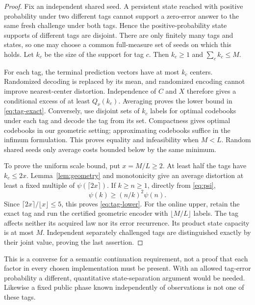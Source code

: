 \begin{proof}
Fix an independent shared seed. A persistent state reached with positive probability under two different tags cannot support a zero-error answer to the same fresh challenge under both tags. Hence the positive-probability state supports of different tags are disjoint. There are only finitely many tags and states, so one may choose a common full-measure set of seeds on which this holds. Let $k_c$ be the size of the support for tag $c$. Then $k_c\ge1$ and $\sum_c k_c\le M$.

For each tag, the terminal prediction vectors have at most $k_c$ centers. Randomized decoding is replaced by its mean, and randomized encoding cannot improve nearest-center distortion. Independence of $C$ and $X$ therefore gives a conditional excess of at least $Q_\nu(k_c)$. Averaging proves the lower bound in \eqref{eq:tag-exact}. Conversely, use disjoint sets of $k_c$ labels for optimal codebooks under each tag and decode the tag from its set. Compactness gives optimal codebooks in our geometric setting; approximating codebooks suffice in the infimum formulation. This proves equality and infeasibility when $M<L$. Random shared seeds only average costs bounded below by the same minimum.

To prove the uniform scale bound, put $x=M/L\ge2$. At least half the tags have $k_c\le2x$. Lemma~\ref{lem:geometry} and monotonicity give an average distortion at least a fixed multiple of $\psi(\lceil2x\rceil)$. If $k\ge n\ge1$, directly from \eqref{eq:psi},
\[
 \psi(k)\ge(n/k)^2\psi(n).
\]
Since $\lceil2x\rceil/\lfloor x\rfloor\le5$, this proves \eqref{eq:tag-lower}. For the online upper, retain the exact tag and run the certified geometric encoder with $\lfloor M/L\rfloor$ labels. The tag affects neither its acquired law nor its error recurrence. Its product state capacity is at most $M$. Independent separately challenged tags are distinguished exactly by their joint value, proving the last assertion.
\end{proof}

This is a converse for a semantic continuation requirement, not a proof that each factor in every chosen implementation must be present. With an allowed tag-error probability a different, quantitative state-separation argument would be needed. Likewise a fixed public phase known independently of observations is not one of these tags.

